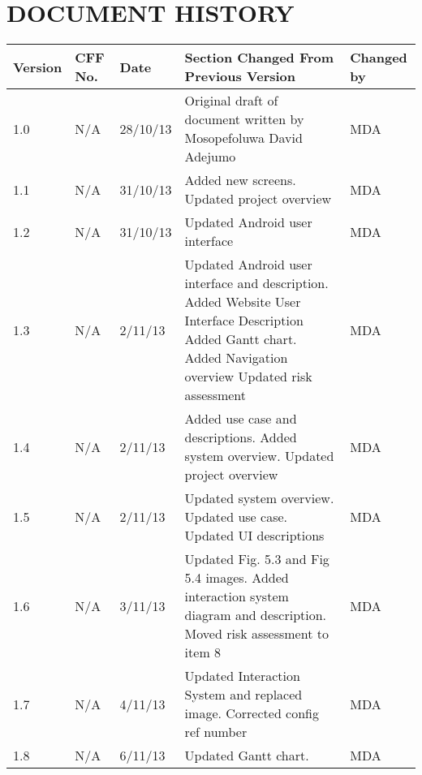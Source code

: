 \documentclass[12pt]{article}
\begin{document}
\section{DOCUMENT HISTORY}
\begin{longtable}{|p{2.5cm}|p{1.5cm}|p{2cm}|p{4cm}| p{2cm}|}
\hline
	Version & CFF No. & Date & Section Changed From Previous Version & Changed by \\
\hline
	1.0 & N/A & 28/10/13 & Original draft of document written by Mosopefoluwa David Adejumo & MDA \\ 
\hline
	1.1 & N/A & 31/10/13 & Added new screens. Updated project overview &MDA \\
\hline
	1.2 & N/A & 31/10/13 & Updated Android user interface & MDA \\
\hline 
	1.3 & N/A & 2/11/13 & Updated Android user interface and description.
Added Website User Interface Description
Added Gantt chart. Added Navigation overview
Updated risk assessment & MDA \\
\hline 
	1.4 & N/A & 2/11/13 & Added use case and descriptions. Added system overview. Updated project overview & MDA \\
\hline 
	1.5 & N/A & 2/11/13 & Updated system overview. Updated use case. Updated UI descriptions & MDA \\
\hline
	1.6 & N/A & 3/11/13 & Updated Fig. 5.3 and Fig 5.4 images. Added interaction system diagram and description.
Moved risk assessment to item 8 & MDA \\
\hline 
	1.7 & N/A & 4/11/13 & Updated Interaction System and replaced image. Corrected config ref number & MDA \\
\hline 
	1.8 & N/A & 6/11/13 & Updated Gantt chart. & MDA \\
\hline	
\end{longtable}
\end{document}
